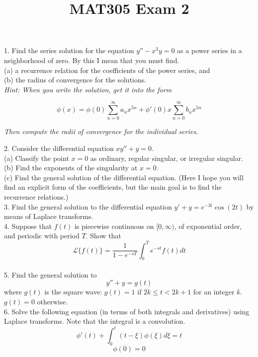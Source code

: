 \documentclass[letter]{article}
\title{MAT305 Exam 2}
\date{}
\newcommand{\laplace}[1]{\mathscr{L}\{#1\}}
\begin{document}
\maketitle
\vspace{-.5in}
1. Find the series solution for the equation $y''-x^3y = 0$ as a power series in a neighborhood of zero. By this I mean that you must find.\\
(a) a recurrence relation for the coefficients of the power series, and\\
(b) the radius of convergence for the solutions.\\

\emph{Hint: When you write the solution, get it into the form}

\[
\phi(x) = \phi(0) \sum_{n=0}^{\infty} a_n x^{5n} + \phi '(0)x\sum_{n=0}^\infty b_n x^{5n}
\]

\emph{Then compute the radii of convergence for the individual series. }

2. Consider the differential equation $xy''+y=0$.\\
(a) Classify the point $x=0$ as ordinary, regular singular, or irregular singular.\\
(b) Find the exponents of the singularity at $x=0$.\\
(c) Find the general solution of the differential equation. (Here I hope you will find an explicit form of the coefficients, but the main goal is to find the recurrence relations.)\\

3. Find the general solution to the differential equation $y'+y = e^{-3t} \cos(2t)$ by means of Laplace transforms.\\

4. Suppose that $f(t)$ is piecewise continuous on $[0,\infty)$, of exponential order, and periodic with period $T$. Show that
\[
\laplace{f(t)} = \frac{1}{1-e^{-sT}} \int_0^T e^{-st}f(t)dt
\]\\

5. Find the general solution to
\[
y''+y = g(t)
\]
where $g(t)$ is the square wave: $g(t) = 1$ if $2k\leq t < 2k+1$ for an integer $k$. $g(t) = 0$ otherwise.\\

6. Solve the following equation (in terms of both integrals and derivatives) using Laplace transforms. Note that the integral is a convolution.
\[\phi'(t) + \int_0^t(t-\xi) \phi(\xi) d\xi = t\]
\[\phi(0) = 0 \]
\end{document}
